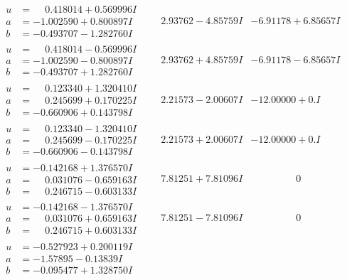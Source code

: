 \documentclass[1p]{elsarticle_modified}
\theoremstyle{definition}
\begin{document}
$$\begin{array}{c|c|c}
\begin{aligned}
u &= \phantom{-}0.418014 + 0.569996 I \\
a &= -1.002590 + 0.800897 I \\
b &= -0.493707 - 1.282760 I\end{aligned}
 & \phantom{-}2.93762 - 4.85759 I & -6.91178 + 6.85657 I \\ \hline\begin{aligned}
u &= \phantom{-}0.418014 - 0.569996 I \\
a &= -1.002590 - 0.800897 I \\
b &= -0.493707 + 1.282760 I\end{aligned}
 & \phantom{-}2.93762 + 4.85759 I & -6.91178 - 6.85657 I \\ \hline\begin{aligned}
u &= \phantom{-}0.123340 + 1.320410 I \\
a &= \phantom{-}0.245699 + 0.170225 I \\
b &= -0.660906 + 0.143798 I\end{aligned}
 & \phantom{-}2.21573 - 2.00607 I & -12.00000 + 0. I\phantom{ +0.000000I} \\ \hline\begin{aligned}
u &= \phantom{-}0.123340 - 1.320410 I \\
a &= \phantom{-}0.245699 - 0.170225 I \\
b &= -0.660906 - 0.143798 I\end{aligned}
 & \phantom{-}2.21573 + 2.00607 I & -12.00000 + 0. I\phantom{ +0.000000I} \\ \hline\begin{aligned}
u &= -0.142168 + 1.376570 I \\
a &= \phantom{-}0.031076 - 0.659163 I \\
b &= \phantom{-}0.246715 - 0.603133 I\end{aligned}
 & \phantom{-}7.81251 + 7.81096 I & \phantom{-0.000000 } 0 \\ \hline\begin{aligned}
u &= -0.142168 - 1.376570 I \\
a &= \phantom{-}0.031076 + 0.659163 I \\
b &= \phantom{-}0.246715 + 0.603133 I\end{aligned}
 & \phantom{-}7.81251 - 7.81096 I & \phantom{-0.000000 } 0 \\ \hline\begin{aligned}
u &= -0.527923 + 0.200119 I \\
a &= -1.57895 - 0.13839 I \\
b &= -0.095477 + 1.328750 I\end{aligned}

\end{array}$$
\end{document}
